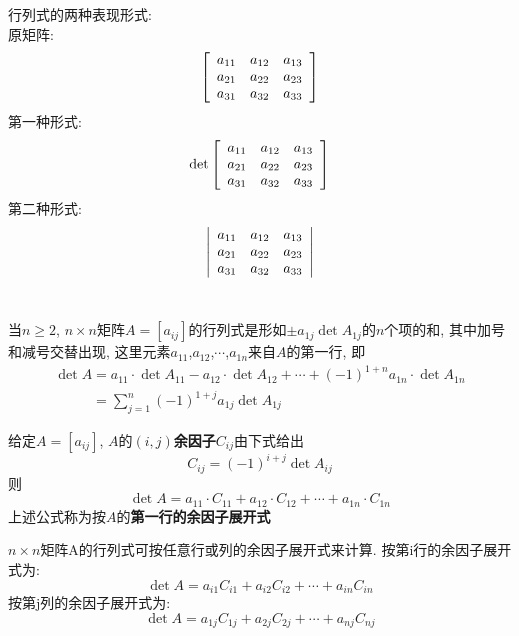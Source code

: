 行列式的两种表现形式:\\
原矩阵:\\
\[\left[\begin{array}{l l l}
a_{11} & a_{12} & a_{13}\\
a_{21} & a_{22} & a_{23}\\
a_{31} & a_{32} & a_{33}
\end{array}\right]\]
第一种形式:\\
\[\det\left[\begin{array}{l l l}
a_{11} & a_{12} & a_{13}\\
a_{21} & a_{22} & a_{23}\\
a_{31} & a_{32} & a_{33}
\end{array}\right]\]
第二种形式:\\
\[\left|\begin{array}{l l l}
a_{11} & a_{12} & a_{13}\\
a_{21} & a_{22} & a_{23}\\
a_{31} & a_{32} & a_{33}
\end{array}\right|\]\\[2ex]

\begin{definition}
当$n\geqslant 2$, $n\times n$矩阵$A=[a_{ij}]$的行列式是形如$\pm a_{1j}\det A_{1j}$的$n$个项的和, 其中加号和减号交替出现, 这里元素$a_{11}$,$a_{12}$,$\cdots$,$a_{1n}$来自$A$的第一行, 即
\[\begin{array}{l}
\det A=a_{11}\cdot\det A_{11}-a_{12}\cdot\det A_{12}+\cdots+(-1)^{1+n}a_{1n}\cdot\det A_{1n}\\
\phantom{\det A}=\displaystyle\sum_{j=1}^n(-1)^{1+j}a_{1j}\det A_{1j}
\end{array}\]
\end{definition}\vspace{4ex}

给定$A=[a_{ij}]$, $A$的$(i,j)$\textbf{余因子}$C_{ij}$由下式给出
\[C_{ij}=(-1)^{i+j}\det A_{ij}\]
则
\[\det A=a_{11}\cdot C_{11}+a_{12}\cdot C_{12}+\cdots+a_{1n}\cdot C_{1n}\]
上述公式称为按$A$的\textbf{第一行的余因子展开式}\\[2ex]

\begin{TheoremOne}
$n\times n$矩阵A的行列式可按任意行或列的余因子展开式来计算. 按第i行的余因子展开式为:
\[\det A=a_{i1}C_{i1}+a_{i2}C_{i2}+\cdots+a_{in}C_{in}\]
按第j列的余因子展开式为:
\[\det A=a_{1j}C_{1j}+a_{2j}C_{2j}+\cdots+a_{nj}C_{nj}\]
\end{TheoremOne}\vspace{4ex}

